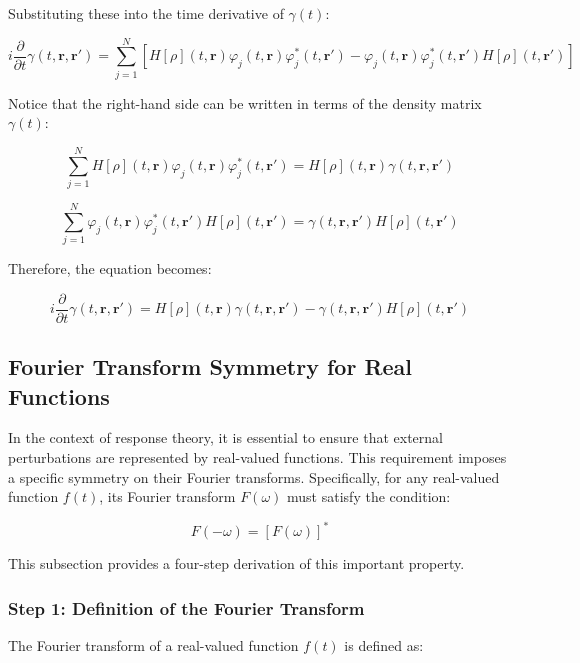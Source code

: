 \documentclass[12pt]{article}
\begin{document}
Substituting these into the time derivative of \( \gamma(t) \):

\[
i \frac{\partial}{\partial t} \gamma(t, \mathbf{r}, \mathbf{r}') = \sum_{j=1}^{N} \left[ H[\rho](t, \mathbf{r}) \varphi_{j}(t, \mathbf{r}) \varphi_{j}^{*}(t, \mathbf{r}') - \varphi_{j}(t, \mathbf{r}) \varphi_{j}^{*}(t, \mathbf{r}') H[\rho](t, \mathbf{r}') \right]
\]

Notice that the right-hand side can be written in terms of the density matrix \( \gamma(t) \):

\[
\sum_{j=1}^{N} H[\rho](t, \mathbf{r}) \varphi_{j}(t, \mathbf{r}) \varphi_{j}^{*}(t, \mathbf{r}') = H[\rho](t, \mathbf{r}) \gamma(t, \mathbf{r}, \mathbf{r}')
\]

\[
\sum_{j=1}^{N} \varphi_{j}(t, \mathbf{r}) \varphi_{j}^{*}(t, \mathbf{r}') H[\rho](t, \mathbf{r}') = \gamma(t, \mathbf{r}, \mathbf{r}') H[\rho](t, \mathbf{r}')
\]

Therefore, the equation becomes:

\[
i \frac{\partial}{\partial t} \gamma(t, \mathbf{r}, \mathbf{r}') = H[\rho](t, \mathbf{r}) \gamma(t, \mathbf{r}, \mathbf{r}') - \gamma(t, \mathbf{r}, \mathbf{r}') H[\rho](t, \mathbf{r}')
\]

\subsection{Fourier Transform Symmetry for Real Functions}
\label{sec:FourierTransformSymmetry}

In the context of response theory, it is essential to ensure that external perturbations are represented by real-valued functions. This requirement imposes a specific symmetry on their Fourier transforms. Specifically, for any real-valued function \( f(t) \), its Fourier transform \( F(\omega) \) must satisfy the condition:

\begin{equation}
F(-\omega) = [F(\omega)]^* \label{eq:FourierSymmetry}
\end{equation}

This subsection provides a four-step derivation of this important property.

\subsubsection*{Step 1: Definition of the Fourier Transform}

The Fourier transform of a real-valued function \( f(t) \) is defined as:
\end{document}
